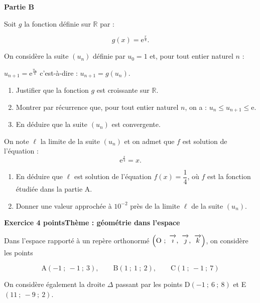 \documentclass[10pt,a4paper]{article}
\newcommand{\R}{\mathbb{R}}
\newcommand{\vect}[1]{\overrightarrow{\,\mathstrut#1\,}}
\def\Oijk{$\left(\text{O}~;~\vect{\imath},~\vect{\jmath},~\vect{k}\right)$}
\begin{document}
\bigskip

\textbf{Partie B}

\medskip

Soit $g$ la fonction définie sur $\R$ par :

\[g(x) = \text{e}^{\frac{x}{4}}.\]

On considère la suite $\left(u_n\right)$ définie par $u_0 = 1$ et, pour tout entier naturel $n$ :

$u_{n+1} = \text{e}^{\frac{u_n}{4}}$ c'est-à-dire : $u_{n+1} = g\left(u_n\right)$.

\medskip

\begin{enumerate}
\item Justifier que la fonction $g$ est croissante sur $\R$.
\item Montrer par récurrence que, pour tout entier naturel $n$, on a : $u_n \leqslant  u_{n+1} \leqslant \text{e}$.
\item En déduire que la suite $\left(u_n\right)$ est convergente.
\end{enumerate}

On note $\ell$ la limite de la suite $\left(u_n\right)$ et on admet que $f$ est solution de l'équation : 
\[\text{e}^{\frac{x}{4}} = x.\]

\begin{enumerate}[resume]
\item En déduire que $\ell$ est solution de l'équation $f(x) = \dfrac14$, où $f$ est la fonction étudiée dans
la partie A.
\item Donner une valeur approchée à $10^{-2}$ près de la limite $\ell$ de la suite $\left(u_n\right)$.
\end{enumerate}

\bigskip

\textbf{Exercice 4  points\hfill Thème : géométrie dans l'espace}

\medskip

Dans l'espace rapporté à un repère orthonormé \Oijk, on considère les points

\[\text{A}(-1~;~-1~;~3),\qquad \text{B}(1~;~1~;~2),\qquad  \text{C}(1~;~-1~;~7)\]

On considère également la droite $\Delta$ passant par les points D$(-1~;~6~;~8)$ et E$(11~;~- 9~;~2)$.

\medskip
\end{document}
